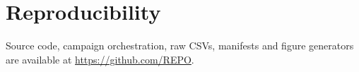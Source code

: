 \documentclass[conference]{IEEEtran}
\begin{document}
\section*{Reproducibility}
Source code, campaign orchestration, raw CSVs, manifests and figure
generators are available at \url{https://github.com/REPO}.



\end{document}
